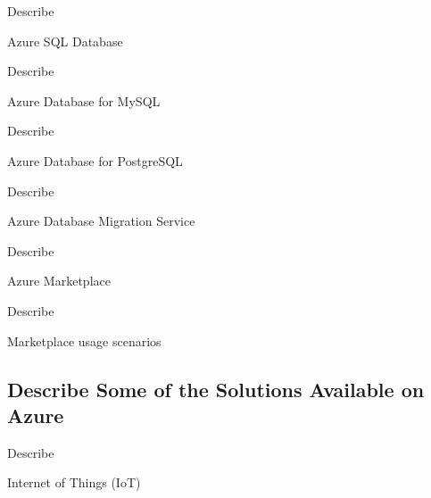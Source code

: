 \documentclass{scrartcl}
\newenvironment{flashcard}[2][]{%
    #1
    \vfill
    \centerline{\Large{#2}}
    \vfill
    \newpage
}
{\newpage}
\newcommand{\subsectioncard}[1]{
    \vspace*{\stretch{1}}
    \subsection{#1}
    \vspace*{\stretch{1}}
    \pagebreak
}
\begin{document}
    \begin{flashcard}[Describe]{Azure SQL Database}

    \end{flashcard}

    \begin{flashcard}[Describe]{Azure Database for MySQL}

    \end{flashcard}

    \begin{flashcard}[Describe]{Azure Database for PostgreSQL}

    \end{flashcard}

    \begin{flashcard}[Describe]{Azure Database Migration Service}

    \end{flashcard}

    \begin{flashcard}[Describe]{Azure Marketplace}

    \end{flashcard}

    \begin{flashcard}[Describe]{Marketplace usage scenarios}

    \end{flashcard}

    \subsectioncard{Describe Some of the Solutions Available on Azure}

    \begin{flashcard}[Describe]{Internet of Things (IoT)}

    \end{flashcard}
\end{document}
